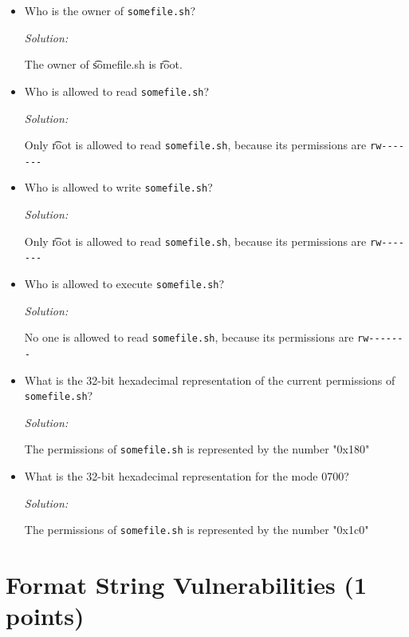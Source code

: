 \documentclass[a4paper,11pt]{article}
\newenvironment{solution}%
{\par{\noindent\small\textit{Solution:}}\vspace{-1ex}\begin{framed}}%
{\end{framed}\par}
\begin{document}
\begin{itemize}
  \item Who is the owner of \texttt{somefile.sh}?

  \ifsolution\begin{solution}
	  The owner of \t{somefile.sh} is \t{root}.
\end{solution}\fi

  \item Who is allowed to read \texttt{somefile.sh}?

  \ifsolution\begin{solution}
	  Only \t{root} is allowed to read \texttt{somefile.sh}, because its permissions are \verb|rw-------|
\end{solution}\fi

  \item Who is allowed to write \texttt{somefile.sh}?

  \ifsolution\begin{solution}
  Only \t{root} is allowed to read \texttt{somefile.sh}, because its permissions are \verb|rw-------|
\end{solution}\fi

  \item Who is allowed to execute \texttt{somefile.sh}?

  \ifsolution\begin{solution}
  No one is allowed to read \texttt{somefile.sh}, because its permissions are \verb|rw-------|
\end{solution}\fi

  \item What is the 32-bit hexadecimal representation of the current permissions
  of \texttt{somefile.sh}?

  \ifsolution\begin{solution}
  The permissions of \texttt{somefile.sh} is represented by the number "0x180"
\end{solution}\fi

  \item What is the 32-bit hexadecimal representation for the mode 0700? 

  \ifsolution\begin{solution}
  The permissions of \texttt{somefile.sh} is represented by the number "0x1c0"
\end{solution}\fi
\end{itemize}


\section*{Format String Vulnerabilities (1 points)}
\end{document}
